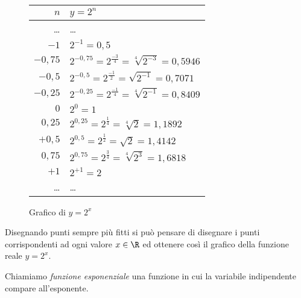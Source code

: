 \begin{figure}[h]
 \centering
 \begin{minipage}[]{.48\textwidth}
  \begin{center}
  \renewcommand\arraystretch{1.3}
   \begin{tabular}{r|l}
    $n$   & $y=2^n$ \\
    \hline
    \dots & \dots \\
    $-1$ & $2^{-1} = 0,5$ \\
    $-0,75$ & $2^{-0,75} = 2^{\frac{-3}{4}} = \sqrt[4]{2^{-3}} = 0,5946$ \\
    $-0,5$ & $2^{-0,5} = 2^{\frac{-1}{2}} = \sqrt{2^{-1}} = 0,7071$ \\
    $-0,25$ & $2^{-0,25} = 2^{\frac{-1}{4}} = \sqrt[4]{2^{-1}} = 0,8409$ \\
    $0$ & $2^{0} = 1$ \\
    $0,25$ & $2^{0,25} = 2^{\frac{1}{4}} = \sqrt[4]{2} = 1,1892$ \\
    $+0,5$ & $2^{0,5} = 2^{\frac{1}{2}} = \sqrt{2} = 1,4142$ \\
    $0,75$ & $2^{0,75} = 2^{\frac{3}{4}} = \sqrt[4]{2^3} = 1,6818$ \\
    $+1$ & $2^{+1} = 2$ \\
    \dots & \dots \\
   \end{tabular}
  \end{center}
 \end{minipage}
\begin{minipage}[]{.48\textwidth}
\begin{center}
\begin{inaccessibleblock}
  \vspace*{.8cm}
  \puntib
  \vspace*{.65cm}
  \caption{Grafico di $y=2^x$} \label{fig:potdue1}
\end{inaccessibleblock}
\end{center}
\end{minipage}
\end{figure}

Disegnando punti sempre più fitti si può pensare di disegnare i punti 
corrispondenti ad ogni valore \(x \in \R\) ed ottenere così il grafico della 
funzione reale \(y=2^x\).

\begin{definizione}{
Chiamiamo \emph{funzione esponenziale} una funzione in cui la variabile indipendente compare all'esponente.
}
\end{definizione}

